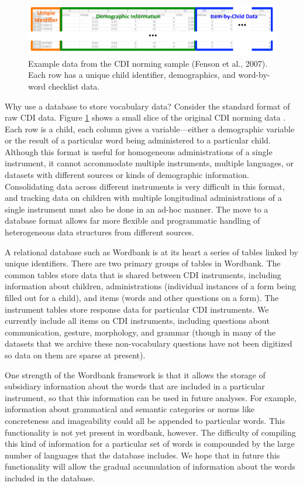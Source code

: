 \documentclass[man,noapacite]{apa}
\begin{document}
\begin{figure}[t]
\centering
\includegraphics[width=5in]{figures/itembychild.pdf}
\caption{\label{fig:data} Example data from the CDI norming sample (Fenson et al., 2007). Each row has a unique child identifier, demographics, and word-by-word checklist data. }
\end{figure}

Why use a database to store vocabulary data? Consider the standard format of raw CDI data. Figure \ref{fig:data} shows a small slice of the original CDI norming data \cite{fenson1994,fenson2007}. Each row is a child, each column gives a variable---either a demographic variable or the result of a particular word being administered to a particular child. Although this format is useful for homogeneous administrations of a single instrument, it cannot accommodate multiple instruments, multiple languages, or datasets with different sources or kinds of demographic information. Consolidating data across different instruments is very difficult in this format, and tracking data on children with multiple longitudinal administrations of a single instrument must also be done in an ad-hoc manner. The move to a database format allows far more flexible and programmatic handling of heterogeneous data structures from different sources. 

A relational database such as Wordbank is at its heart a series of tables linked by unique identifiers. There are two primary groups of tables in Wordbank. The common tables store data that is shared between CDI instruments, including information about children, administrations (individual instances of a form being filled out for a child), and items (words and other questions on a form). The instrument tables store response data for particular CDI instruments. We currently include all items on CDI instruments, including questions about communication, gesture, morphology, and grammar (though in many of the datasets that we archive these non-vocabulary questions have not been digitized so data on them are sparse at present). 

One strength of the Wordbank framework is that it allows the storage of subsidiary information about the words that are included in a particular instrument, so that this information can be used in future analyses. For example, information about grammatical and semantic categories or norms like concreteness and imageability could all be appended to particular words. This functionality is not yet present in wordbank, however. The difficulty of compiling this kind of information for a particular set of words is compounded by the large number of languages that the database includes. We hope that in future this functionality will allow the gradual accumulation of information about the words included in the database.
\end{document}
